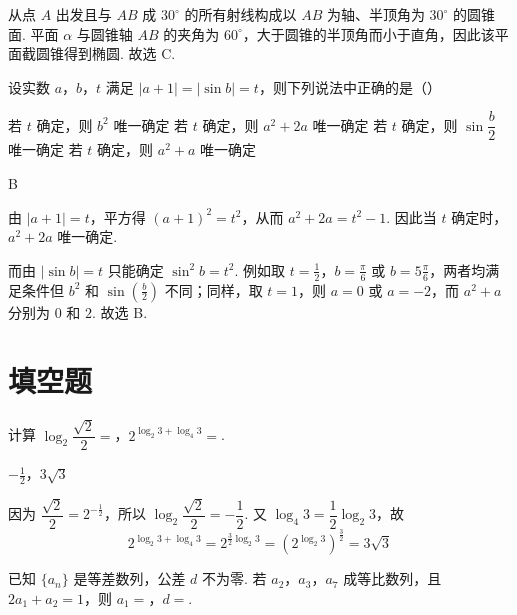 \begin{solution}
从点 \(A\) 出发且与 \(AB\) 成 \(30^\circ\) 的所有射线构成以 \(AB\) 为轴、半顶角为 \(30^\circ\) 的圆锥面. 平面 \(\alpha\) 与圆锥轴 \(AB\) 的夹角为 \(60^\circ\)，大于圆锥的半顶角而小于直角，因此该平面截圆锥得到椭圆. 故选 C.
\end{solution}

\begin{problem}
设实数 \(a\)，\(b\)，\(t\) 满足 \(|a+1|=|\sin b|=t\)，则下列说法中正确的是（\quad）

\choices
    {若 \(t\) 确定，则 \(b^2\) 唯一确定}
    {若 \(t\) 确定，则 \(a^2+2a\) 唯一确定}
    {若 \(t\) 确定，则 \(\sin\dfrac{b}{2}\) 唯一确定}
    {若 \(t\) 确定，则 \(a^2+a\) 唯一确定}
\end{problem}

\begin{answer}
B
\end{answer}

\begin{solution}
由 \(|a+1|=t\)，平方得 \((a+1)^2=t^2\)，从而 \(a^2+2a=t^2-1\). 因此当 \(t\) 确定时，\(a^2+2a\) 唯一确定.

而由 \(|\sin b|=t\) 只能确定 \(\sin^2b=t^2\). 例如取 \(t=\frac{1}{2}\)，\(b=\frac{\pi}{6}\) 或 \(b=5\frac{\pi}{6}\)，两者均满足条件但 \(b^2\) 和 \(\sin(\frac{b}{2})\) 不同；同样，取 \(t=1\)，则 \(a=0\) 或 \(a=-2\)，而 \(a^2+a\) 分别为 \(0\) 和 \(2\). 故选 B.
\end{solution}

\section{填空题}

\begin{problem}
计算 \(\log_2\dfrac{\sqrt{2}}{2}=\)\fillinblank{}，\(2^{\log_2 3+\log_4 3}=\)\fillinblank{}.
\end{problem}

\begin{answer}
\(-\frac{1}{2}\)，\(3\sqrt{3}\)
\end{answer}

\begin{solution}
因为 \(\dfrac{\sqrt{2}}{2}=2^{-\frac{1}{2}}\)，所以 \(\log_2\dfrac{\sqrt{2}}{2}=-\dfrac12\). 又 \(\log_4 3=\dfrac12\log_2 3\)，故
\[
2^{\log_2 3+\log_4 3}=2^{\frac32\log_2 3}=\left(2^{\log_2 3}\right)^{\frac{3}{2}}=3\sqrt{3}
\]
\end{solution}

\begin{problem}
已知 \(\{a_n\}\) 是等差数列，公差 \(d\) 不为零. 若 \(a_2\)，\(a_3\)，\(a_7\) 成等比数列，且 \(2a_1+a_2=1\)，则 \(a_1=\)\fillinblank{}，\(d=\)\fillinblank{}.
\end{problem}

